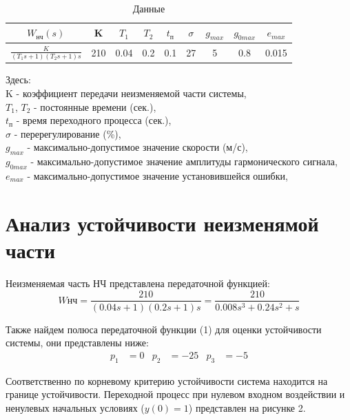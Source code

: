 \documentclass[a4paper, 12pt]{article}
\renewcommand{\arraystretch}{1.3}
\begin{document}
\begin{table}[h!]
    \centering
    \begin{threeparttable}        
        \caption{Данные}
        \def\arraystretch{2}
        \begin{tabular} {|c|c|c|c|c|c|c|c|c|}
            \hline
            $W_\text{нч}(s)$ & K & $T_1$ & $T_2$ & $t_\text{п}$ & $\sigma$ & $g_{max}$ & $g_{0max}$ & $e_{max}$ \\ \hline 
            $\displaystyle\frac{K}{(T_1s + 1)(T_2s + 1)s}$ & 210 & 0.04 & 0.2 & 0.1 & 27 & 5 & 0.8 & 0.015 \\ [2mm] \hline 
        \end{tabular}
    \end{threeparttable}
\end{table}

\noindent
Здесь: \\
K - коэффициент передачи неизменяемой части системы, \\
$T_1$, $T_2$ - постоянные времени (сек.), \\
$t_\text{п}$ - время переходного процесса (сек.), \\
$\sigma$ - перерегулирование (\%), \\
$g_{max}$ - максимально-допустимое значение скорости (м/с), \\
$g_{0max}$ - максимально-допустимое значение амплитуды гармонического сигнала, \\
$e_{max}$ - максимально-допустимое значение установившейся ошибки, \par

\newpage
\section{Анализ устойчивости неизменямой части}

Неизменяемая часть НЧ представлена передаточной функцией:
\begin{equation}
    W\text{нч} = \frac{210}{(0.04s + 1)(0.2s + 1)s} = \frac{210}{0.008s^3 + 0.24s^2 + s}
\end{equation}

Также найдем полюса передаточной функции (1) для оценки устойчивости системы, они представлены ниже:
\begin{align*}
    p_1 & = 0 & p_2 & = -25 & p_3 & = -5
\end{align*} \par
Соответственно по корневому критерию устойчивости система находится на границе устойчивости. Переходной процесс при нулевом входном воздействии и ненулевых начальных условиях ($y(0) = 1$) представлен на рисунке 2.
\end{document}
